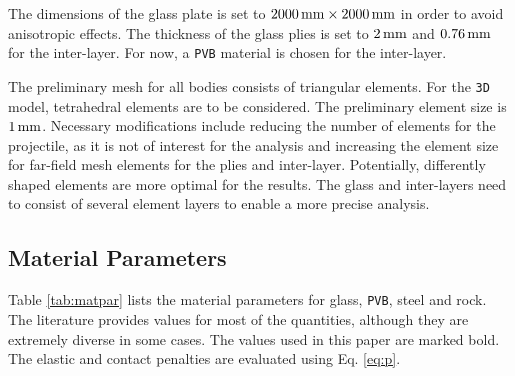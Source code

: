 \documentclass[format=acmtog,12pt,screen=true,review=false,natbib=false,]{acmart}
\begin{document}
\bigbreak
The dimensions of the glass plate is set to $2000\,{\rm{mm}}\times2000\,{\rm{mm}}$ in order to avoid anisotropic effects. The thickness of the glass plies is set to $2\,{\rm{mm}}$ and $0.76\,{\rm{mm}}$ for the inter-layer. For now, a \texttt{PVB} material is chosen for the inter-layer.

\bigbreak
The preliminary mesh for all bodies consists of triangular elements. For the \texttt{3D} model, tetrahedral elements \cite{Che18} are to be considered. The preliminary element size is $1\,{\rm{mm}}$. Necessary modifications include reducing the number of elements for the projectile, as it is not of interest for the analysis and increasing the element size for far-field mesh elements for the plies and inter-layer. Potentially, differently shaped elements are more optimal for the results. The glass and inter-layers need to consist of several element layers to enable a more precise analysis. 

\subsection{Material Parameters}
\label{subsec:MaterialParameters}

Table \ref{tab:matpar} lists the material parameters for glass, \texttt{PVB}, steel and rock. The literature provides values for most of the quantities, although they are extremely diverse in some cases. The values used in this paper are marked bold. The elastic and contact penalties are evaluated using Eq. \ref{eq:p}.
\end{document}
